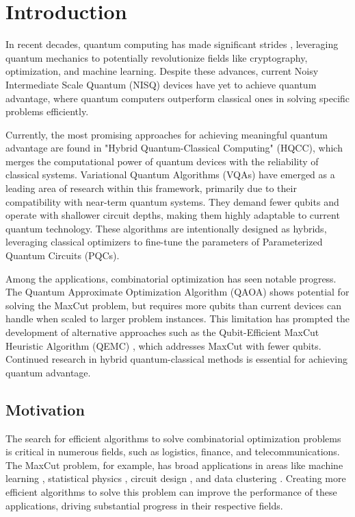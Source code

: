 \section{Introduction}
\label{sec:intro}
In recent decades, quantum computing has made significant strides \cite{preskill2023quantum}, leveraging quantum mechanics to potentially revolutionize fields like cryptography, optimization, and machine learning. Despite these advances, current Noisy Intermediate Scale Quantum (NISQ) devices have yet to achieve quantum advantage, where quantum computers outperform classical ones in solving specific problems efficiently.

Currently, the most promising approaches for achieving meaningful quantum advantage are found in "Hybrid Quantum-Classical Computing" (HQCC), which merges the computational power of quantum devices with the reliability of classical systems. Variational Quantum Algorithms (VQAs) have emerged as a leading area of research within this framework, primarily due to their compatibility with near-term quantum systems. They demand fewer qubits and operate with shallower circuit depths, making them highly adaptable to current quantum technology. These algorithms are intentionally designed as hybrids, leveraging classical optimizers to fine-tune the parameters of Parameterized Quantum Circuits (PQCs).

Among the applications, combinatorial optimization has seen notable progress. The Quantum Approximate Optimization Algorithm (QAOA) \cite{farhi2014quantum} shows potential for solving the MaxCut problem, but requires more qubits than current devices can handle when scaled to larger problem instances. This limitation has prompted the development of alternative approaches such as the Qubit-Efficient MaxCut Heuristic Algorithm (QEMC) \cite{tenecohen2023variational}, which addresses MaxCut with fewer qubits. Continued research in hybrid quantum-classical methods is essential for achieving quantum advantage.

\subsection{Motivation}
\label{section:motivation}
The search for efficient algorithms to solve combinatorial optimization problems is critical in numerous fields, such as logistics, finance, and telecommunications. The MaxCut problem, for example, has broad applications in areas like machine learning \cite{937505}, statistical physics \cite{Barahona_Grötschel_Jünger_Reinelt_1988}, circuit design \cite{Barahona_Grötschel_Jünger_Reinelt_1988}, and data clustering \cite{10.1007/11893318_21}. Creating more efficient algorithms to solve this problem can improve the performance of these applications, driving substantial progress in their respective fields.

